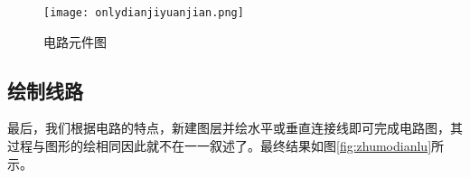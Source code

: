 \noindent
\begin{figure}
\centering
\texttt{[image: onlydianjiyuanjian.png]}
\caption{电路元件图}\label{fig:onlydianziyujian}
\end{figure}
\subsection{绘制线路}
最后，我们根据电路的特点，新建图层并绘水平或垂直连接线即可完成电路图，其过程与图形的绘相同因此就不在一一叙述了。最终结果如图\ref{fig:zhumodianlu}所示。

\endinput